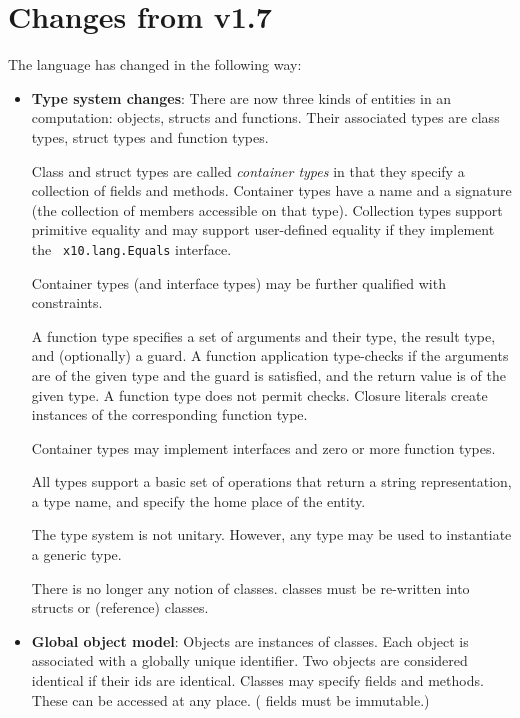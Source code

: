 \section{Changes from \Xten{} v1.7}

The language has changed in the following way:
\begin{itemize}

\item {\bf Type system changes}: There are now three kinds of entities
  in an \Xten{} computation: objects, structs and functions. Their
  associated types are class types, struct types and function
  types. 

  Class and struct types are called {\em container types} in that they
  specify a collection of fields and methods. Container types have a
  name and a signature (the collection of members accessible on that
  type). Collection types support primitive equality \Xcd{==} and may
  support user-defined equality if they implement the {\tt
    x10.lang.Equals} interface. 

  Container types (and interface types) may be further qualified with
  constraints.

  A function type specifies a set of arguments and their type, the
  result type, and (optionally) a guard. A function application
  type-checks if the arguments are of the given type and the guard is
  satisfied, and the return value is of the given type.  A function
  type does not permit \Xcd{==} checks. Closure literals create
  instances of the corresponding function type.

  Container types may implement interfaces and zero or more function
  types.

  All types support a basic set of operations that return a string
  representation, a type name, and specify the home place of the entity.

  The type system is not unitary. However, any type may be used to
  instantiate a generic type. 

  There is no longer any notion of  classes. 
  classes must be re-written into structs or (reference) classes. 

\item {\bf Global object model}: Objects are instances of
  classes. Each object is associated with a globally unique
  identifier. Two objects are considered identical \Xcd{==} if their
  ids are identical. Classes may specify  fields and
  methods. These can be accessed at any place. ( fields
  must be immutable.)


\end{itemize}
